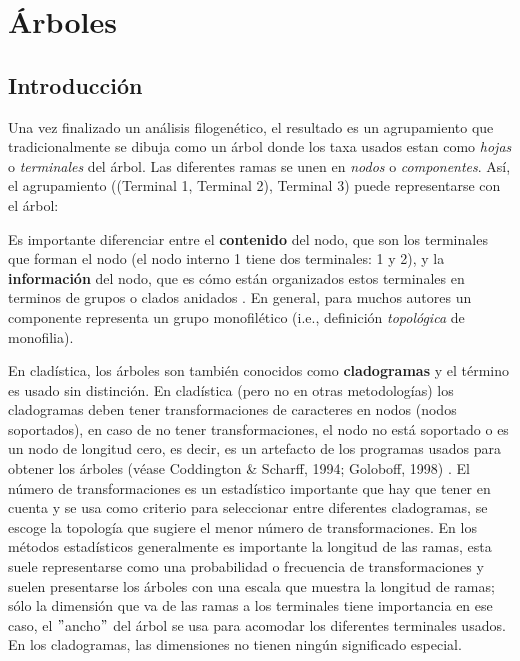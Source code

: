 \chapter{\'Arboles}
\section*{Introducci\'on}

Una vez finalizado un an\'alisis filogen\'etico, el resultado es un agrupamiento que tradicionalmente se dibuja como un \'arbol donde los taxa usados estan como \emph{hojas} o \emph{terminales} del \'arbol. Las diferentes ramas se unen en \emph{nodos} o \emph{componentes}. As\'i, el agrupamiento ((Terminal 1, Terminal 2), Terminal 3) puede representarse con el \'arbol:

\begin{center}
%
%
\end{center}

Es importante diferenciar entre el \textbf{contenido} del nodo, que son los terminales que forman el nodo (el nodo interno 1 tiene dos terminales: 1 y 2), y la \textbf{informaci\'on} del nodo, que es c\'omo est\'an organizados estos terminales en terminos de grupos o clados anidados \cite{Nelson1979}. En general, para muchos autores un componente representa un grupo monofil\'etico (i.e., definici\'on \emph{topol\'ogica} de monofilia).

En clad\'istica, los \'arboles son tambi\'en conocidos como \textbf{cladogramas} y el t\'ermino es usado sin distinci\'on. En clad\'istica (pero no en otras metodolog\'ias) los cladogramas deben tener transformaciones de caracteres en nodos (nodos soportados), en caso de no tener transformaciones, el nodo no est\'a soportado o es un nodo de longitud cero, es decir, es un artefacto de los programas usados para obtener los \'arboles (v\'ease Coddington \& Scharff, 1994; Goloboff, 1998)\cite{Coddington1994} \cite{Goloboff1998}. El n\'umero de transformaciones es un estad\'istico importante que hay que tener en cuenta y se usa como criterio para seleccionar entre diferentes cladogramas, se escoge la topolog\'ia que sugiere el  menor n\'umero de transformaciones. En los m\'etodos estad\'isticos generalmente es importante la longitud de las ramas, esta suele representarse como una probabilidad o frecuencia de transformaciones y suelen presentarse los \'arboles con una escala que muestra la longitud de ramas; s\'olo la dimensi\'on que va de las ramas a los terminales tiene importancia en ese caso, el $"$ancho$"$ del \'arbol se usa para acomodar los diferentes terminales usados. En los cladogramas, las dimensiones no tienen ning\'un significado especial.

